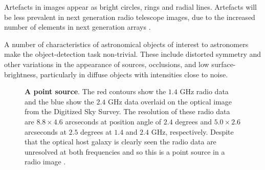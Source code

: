Artefacts in images appear as bright circles, rings and radial lines. Artefacts will be less prevalent in next generation radio telescope images, due to the increased number of elements in next generation arrays \cite{norris2011emu}. 

A number of characteristics of astronomical objects of interest to astronomers make the object-detection task non-trivial. These include distorted symmetry and other variations in the appearance of sources, occlusions, and low surface-brightness, particularly in diffuse objects with intensities close to noise.

\begin{figure}
\centering
{}
\caption[Point source]{\textbf{A point source}. The red contours show the $1.4$ GHz radio data and the blue show the $2.4$ GHz data overlaid on the optical image from the Digitized Sky Survey. The resolution of these radio data are $8.8 \times 4.6$ arcseconds at position angle of $2.4$ degrees and $5.0 \times 2.6$ arcseconds at $2.5$ degrees at $1.4$ and $2.4$ GHz, respectively. Despite that the optical host galaxy is clearly seen the radio data are unresolved at both frequencies and so this is a point source in a radio image \cite{johnston2008radio}.}
\label{fig:pointsource}
\end{figure}

